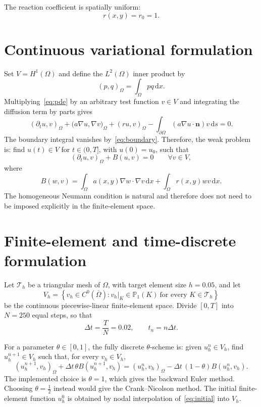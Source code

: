 \documentclass[11pt]{article}
\newcommand{\dx}{\,\mathrm{d}x}
\begin{document}
The reaction coefficient is spatially uniform:
\begin{equation}
    r(x,y)=r_0=1.
    \label{eq:reaction}
\end{equation}

\section{Continuous variational formulation}

Set $V=H^1(\Omega)$ and define the $L^2(\Omega)$ inner product by
\[
    (p,q)_\Omega=\int_\Omega pq\dx.
\]
Multiplying~\eqref{eq:pde} by an arbitrary test function $v\in V$ and
integrating the diffusion term by parts gives
\[
    (\partial_t u,v)_\Omega
    +\bigl(a\nabla u,\nabla v\bigr)_\Omega
    +(ru,v)_\Omega
    -\int_{\partial\Omega}(a\nabla u\cdot\bm n)v\,\mathrm{d}s=0.
\]
The boundary integral vanishes by~\eqref{eq:boundary}. Therefore, the weak
problem is: find $u(t)\in V$ for $t\in(0,T]$, with $u(0)=u_0$, such that
\begin{equation}
    (\partial_t u,v)_\Omega+B(u,v)=0
    \qquad\forall v\in V,
    \label{eq:weak}
\end{equation}
where
\begin{equation}
    B(w,v)
    =\int_\Omega a(x,y)\nabla w\cdot\nabla v\dx
     +\int_\Omega r(x,y)wv\dx.
    \label{eq:bilinear}
\end{equation}
The homogeneous Neumann condition is natural and therefore does not need to
be imposed explicitly in the finite-element space.

\section{Finite-element and time-discrete formulation}

Let $\mathcal{T}_h$ be a triangular mesh of $\Omega$, with target element
size $h=0.05$, and let
\[
    V_h=\left\{v_h\in C^0(\overline\Omega):
    v_h\big|_K\in\mathbb{P}_1(K)\ \text{for every }K\in\mathcal{T}_h
    \right\}
\]
be the continuous piecewise-linear finite-element space. Divide $[0,T]$
into $N=250$ equal steps, so that
\[
    \Delta t=\frac{T}{N}=0.02,
    \qquad t_n=n\Delta t.
\]

For a parameter $\theta\in[0,1]$, the fully discrete $\theta$-scheme is:
given $u_h^n\in V_h$, find $u_h^{n+1}\in V_h$ such that, for every
$v_h\in V_h$,
\begin{equation}
    (u_h^{n+1},v_h)_\Omega
    +\Delta t\,\theta B(u_h^{n+1},v_h)
    =
    (u_h^n,v_h)_\Omega
    -\Delta t\,(1-\theta)B(u_h^n,v_h).
    \label{eq:theta}
\end{equation}
The implemented choice is $\theta=1$, which gives the backward Euler
method. Choosing $\theta=\tfrac12$ instead would give the Crank--Nicolson
method. The initial finite-element function $u_h^0$ is obtained by nodal
interpolation of~\eqref{eq:initial} into $V_h$.
\end{document}
